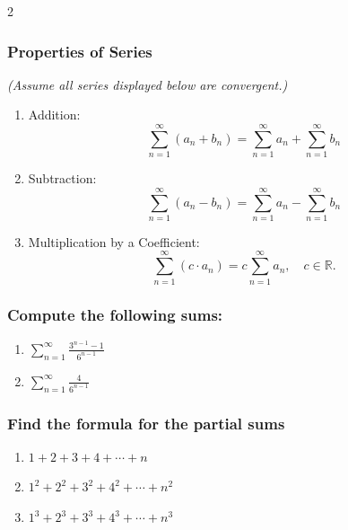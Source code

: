 \documentclass[12pt]{article}
\begin{document}
\begin{multicols}{2}
    \subsubsection*{Properties of Series}
    \textit{(Assume all series displayed below are convergent.)}

    \begin{enumerate}
        \item Addition:
        \[
        \sum_{n=1}^\infty (a_n + b_n) = \sum_{n=1}^\infty a_n + \sum_{n=1}^\infty b_n
        \]
        
        \item Subtraction: 
        \[
        \sum_{n=1}^\infty (a_n - b_n) = \sum_{n=1}^\infty a_n - \sum_{n=1}^\infty b_n
        \]
        
        \item Multiplication by a Coefficient:
        \[
        \sum_{n=1}^\infty (c \cdot a_n) = c \sum_{n=1}^\infty a_n, \quad  c \in \mathbb{R}.
        \]
    \end{enumerate}
    
    \subsubsection*{Compute the following sums:}
    \begin{enumerate}
        \item $\displaystyle \sum_{n=1}^\infty \frac{3^{n-1}-1}{6^{n-1}} $
        \item $\displaystyle \sum_{n=1}^\infty \frac{4}{6^{n-1}} $
    \end{enumerate}
    \columnbreak
    \subsubsection*{Find the formula for the partial sums}
    \begin{enumerate}
        \item $1+2+3+4+ \cdots +n$
        \item $1^2+2^2+3^2+4^2+ \cdots +n^2$
        \item $1^3+2^3+3^3+4^3+ \cdots +n^3$
        
    \end{enumerate}

\end{multicols}
\end{document}
